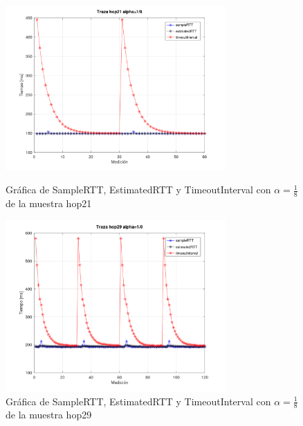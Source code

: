 \newpage
\begin{figure}[H]
  \centering
  \includegraphics[width=0.75\textwidth]{img/alpha18/trazaHop21.png}
  \caption{Gráfica de SampleRTT, EstimatedRTT y TimeoutInterval con \( \alpha = \frac{1}{8} \)
  de la muestra hop21}

  \includegraphics[width=0.75\textwidth]{img/alpha18/trazaHop29.png}
  \caption{Gráfica de SampleRTT, EstimatedRTT y TimeoutInterval con \( \alpha = \frac{1}{8} \)
  de la muestra hop29}
  \label{fig:alpha_default_p2}
\end{figure}

